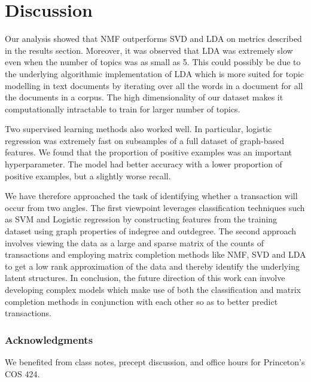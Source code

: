 \documentclass{article} %
\begin{document}
\section{Discussion}

Our analysis showed that NMF outperforms SVD and LDA on metrics described in the results section. Moreover, it was observed that LDA was extremely slow even when the number of topics was as small as 5. This could possibly be due to the underlying algorithmic implementation of LDA which is more suited for topic modelling in text documents by iterating over all the words in a document for all the documents in a corpus. The high dimensionality of our dataset makes it computationally intractable to train for larger number of topics.

Two supervised learning methods also worked well. In particular, logistic regression was extremely fast on subsamples of a full dataset of graph-based features. We found that the proportion of positive examples was an important hyperparameter. The model had better accuracy with a lower proportion of positive examples, but a slightly worse recall.

We have therefore approached the task of identifying whether a transaction will occur from two angles. The first viewpoint leverages classification techniques such as SVM and Logistic regression by constructing features from the training dataset using graph properties of indegree and outdegree. The second approach involves viewing the data as a large and sparse matrix of the counts of transactions and employing matrix completion methods like NMF, SVD and LDA to get a low rank approximation of the data and thereby identify the underlying latent structures. In conclusion, the future direction of this work can involve developing complex models which make use of both the classification and matrix completion methods in conjunction with each other so as to better predict transactions.

\subsubsection*{Acknowledgments}

We benefited from class notes, precept discussion, and office hours for Princeton's COS 424.



\end{document}
